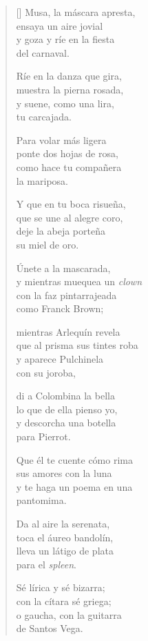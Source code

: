\settowidth{\versewidth}{que al prisma sus tintes roba}

\bigskip

\begin{verse}[\versewidth]
Musa, la máscara apresta, \\
ensaya un aire jovial \\
y goza y ríe en la fiesta \\
del carnaval.

Ríe en la danza que gira, \\
muestra la pierna rosada, \\
y suene, como una lira, \\
tu carcajada.

Para volar más ligera \\
ponte dos hojas de rosa, \\
como hace tu compañera \\
la mariposa.

Y que en tu boca risueña, \\
que se une al alegre coro, \\
deje la abeja porteña \\
su miel de oro.

Únete a la mascarada, \\
y mientras muequea un {\em clown} \\
con la faz pintarrajeada \\
como Franck Brown;

mientras Arlequín revela \\
que al prisma sus tintes roba \\
y aparece Pulchinela \\
con su joroba,

di a Colombina la bella \\
lo que de ella pienso yo, \\
y descorcha una botella \\
para Pierrot.

Que él te cuente cómo rima \\
sus amores con la luna \\
y te haga un poema en una \\
pantomima.

Da al aire la serenata, \\
toca el áureo bandolín, \\
lleva un látigo de plata \\
para el {\em spleen}.

Sé lírica y sé bizarra; \\
con la cítara sé griega; \\
o gaucha, con la guitarra \\
de Santos Vega.


\end{verse}
